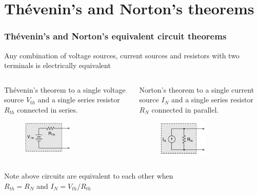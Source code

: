\documentclass[beamer]{standalone}
\begin{document}
\section{Th\'evenin's and Norton's  theorems}
\begin{frame}
 \frametitle{Th\'evenin's and Norton's equivalent circuit theorems}
	Any combination of voltage sources, current sources and resistors with
	two terminals is electrically equivalent 	
	\begin{columns}[t]
		\begin{column}{.45\textwidth}
			\begin{block} {Th\'evenin's theorem}
				to a single voltage source
				$V_{th}$ and a single series resistor $R_{th}$ connected in series.
			\end{block}
			\begin{figure}
				\includegraphics[width=0.55\textwidth]{./circuits/thevenin_circuit}
			\end{figure}
		\end{column}
		\begin{column}{.45\textwidth}
			\begin{block} {Norton's theorem}
				to a single current source
				$I_{N}$ and a single series resistor $R_{N}$ connected in parallel.
			\end{block}
			\begin{figure}
				\includegraphics[width=0.55\textwidth]{./circuits/norton_circuit}
			\end{figure}
		\end{column}
	\end{columns}

	\center Note above circuits are equivalent to each other when\\
	\center $R_{th} = R_N$ and $I_N = V_{th}/R_{th}$
\end{frame}
\end{document}
